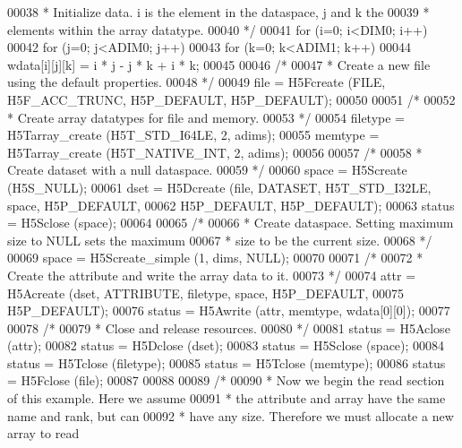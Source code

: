 \begin{DoxyCode}
00038 \textcolor{comment}{     * Initialize data.  i is the element in the dataspace, j and k the}
00039 \textcolor{comment}{     * elements within the array datatype.}
00040 \textcolor{comment}{     */}
00041     \textcolor{keywordflow}{for} (i=0; i<DIM0; i++)
00042         \textcolor{keywordflow}{for} (j=0; j<ADIM0; j++)
00043             \textcolor{keywordflow}{for} (k=0; k<ADIM1; k++)
00044                 wdata[i][j][k] = i * j - j * k + i * k;
00045 
00046     \textcolor{comment}{/*}
00047 \textcolor{comment}{     * Create a new file using the default properties.}
00048 \textcolor{comment}{     */}
00049     file = H5Fcreate (FILE, H5F\_ACC\_TRUNC, H5P\_DEFAULT, H5P\_DEFAULT);
00050 
00051     \textcolor{comment}{/*}
00052 \textcolor{comment}{     * Create array datatypes for file and memory.}
00053 \textcolor{comment}{     */}
00054     filetype = H5Tarray\_create (H5T\_STD\_I64LE, 2, adims);
00055     memtype = H5Tarray\_create (H5T\_NATIVE\_INT, 2, adims);
00056 
00057     \textcolor{comment}{/*}
00058 \textcolor{comment}{     * Create dataset with a null dataspace.}
00059 \textcolor{comment}{     */}
00060     space = H5Screate (H5S\_NULL);
00061     dset = H5Dcreate (file, DATASET, H5T\_STD\_I32LE, space, H5P\_DEFAULT,
00062                 H5P\_DEFAULT, H5P\_DEFAULT);
00063     status = H5Sclose (space);
00064 
00065     \textcolor{comment}{/*}
00066 \textcolor{comment}{     * Create dataspace.  Setting maximum size to NULL sets the maximum}
00067 \textcolor{comment}{     * size to be the current size.}
00068 \textcolor{comment}{     */}
00069     space = H5Screate\_simple (1, dims, NULL);
00070 
00071     \textcolor{comment}{/*}
00072 \textcolor{comment}{     * Create the attribute and write the array data to it.}
00073 \textcolor{comment}{     */}
00074     attr = H5Acreate (dset, ATTRIBUTE, filetype, space, H5P\_DEFAULT,
00075                 H5P\_DEFAULT);
00076     status = H5Awrite (attr, memtype, wdata[0][0]);
00077 
00078     \textcolor{comment}{/*}
00079 \textcolor{comment}{     * Close and release resources.}
00080 \textcolor{comment}{     */}
00081     status = H5Aclose (attr);
00082     status = H5Dclose (dset);
00083     status = H5Sclose (space);
00084     status = H5Tclose (filetype);
00085     status = H5Tclose (memtype);
00086     status = H5Fclose (file);
00087 
00088 
00089     \textcolor{comment}{/*}
00090 \textcolor{comment}{     * Now we begin the read section of this example.  Here we assume}
00091 \textcolor{comment}{     * the attribute and array have the same name and rank, but can}
00092 \textcolor{comment}{     * have any size.  Therefore we must allocate a new array to read}

\end{DoxyCode}
